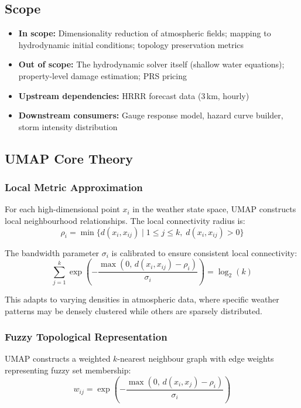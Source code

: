 \documentclass{article}
\begin{document}
\subsection{Scope}
\begin{itemize}[nosep]
    \item \textbf{In scope:} Dimensionality reduction of atmospheric fields; mapping to
          hydrodynamic initial conditions; topology preservation metrics
    \item \textbf{Out of scope:} The hydrodynamic solver itself (shallow water equations);
          property-level damage estimation; PRS pricing
    \item \textbf{Upstream dependencies:} HRRR forecast data (3\,km, hourly)
    \item \textbf{Downstream consumers:} Gauge response model, hazard curve builder,
          storm intensity distribution
\end{itemize}

\mkmframework

\subsection{UMAP Core Theory}

\subsubsection{Local Metric Approximation}
For each high-dimensional point $x_i$ in the weather state space, UMAP constructs local
neighbourhood relationships. The local connectivity radius is:
\begin{equation}
    \rho_i = \min \{ d(x_i, x_{ij}) \mid 1 \leq j \leq k, \; d(x_i, x_{ij}) > 0 \}
\end{equation}

The bandwidth parameter $\sigma_i$ is calibrated to ensure consistent local connectivity:
\begin{equation}
    \sum_{j=1}^k \exp\left(-\frac{\max(0,\, d(x_i, x_{ij}) - \rho_i)}{\sigma_i}\right)
    = \log_2(k)
\end{equation}

This adapts to varying densities in atmospheric data, where specific weather patterns may
be densely clustered while others are sparsely distributed.

\subsubsection{Fuzzy Topological Representation}
UMAP constructs a weighted $k$-nearest neighbour graph with edge weights representing
fuzzy set membership:
\begin{equation}
    w_{ij} = \exp\left(-\frac{\max(0,\, d(x_i, x_j) - \rho_i)}{\sigma_i}\right)
\end{equation}
\end{document}
